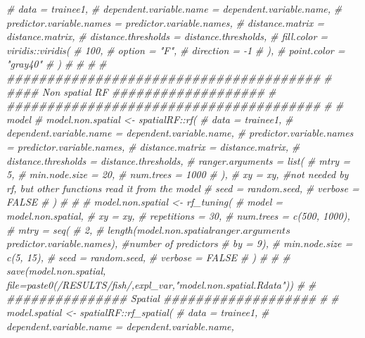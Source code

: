 \documentclass[
]{article}
\newenvironment{Shaded}{\begin{snugshade}}{\end{snugshade}}
\newcommand{\CommentTok}[1]{\textcolor[rgb]{0.56,0.35,0.01}{\textit{#1}}}
\begin{document}
\begin{Shaded}
\begin{Highlighting}[]
\CommentTok{\#   data = trainee1,}
\CommentTok{\#   dependent.variable.name = dependent.variable.name,}
\CommentTok{\#   predictor.variable.names = predictor.variable.names,}
\CommentTok{\#   distance.matrix = distance.matrix,}
\CommentTok{\#   distance.thresholds = distance.thresholds,}
\CommentTok{\#   fill.color = viridis::viridis(}
\CommentTok{\#     100,}
\CommentTok{\#     option = "F",}
\CommentTok{\#     direction = {-}1}
\CommentTok{\#   ),}
\CommentTok{\#   point.color = "gray40"}
\CommentTok{\# )}
\CommentTok{\# }
\CommentTok{\# }
\CommentTok{\# }
\CommentTok{\# \#\#\#\#\#\#\#\#\#\#\#\#\#\#\#\#\#\#\#\#\#\#\#\#\#\#\#\#\#\#\#\#\#\#\#\#\#\#\#}
\CommentTok{\# \#\#\#\# Non spatial RF \#\#\#\#\#\#\#\#\#\#\#\#\#\#\#\#\#\#\#}
\CommentTok{\# \#\#\#\#\#\#\#\#\#\#\#\#\#\#\#\#\#\#\#\#\#\#\#\#\#\#\#\#\#\#\#\#\#\#\#\#\#\#\#}
\CommentTok{\# \# model}
\CommentTok{\# model.non.spatial \textless{}{-} spatialRF::rf(}
\CommentTok{\#   data = trainee1,}
\CommentTok{\#   dependent.variable.name = dependent.variable.name,}
\CommentTok{\#   predictor.variable.names = predictor.variable.names,}
\CommentTok{\#   distance.matrix = distance.matrix,}
\CommentTok{\#   distance.thresholds = distance.thresholds,}
\CommentTok{\#   ranger.arguments = list(}
\CommentTok{\#     mtry = 5,}
\CommentTok{\#     min.node.size = 20,}
\CommentTok{\#     num.trees = 1000}
\CommentTok{\#   ),}
\CommentTok{\#   xy = xy, \#not needed by rf, but other functions read it from the model}
\CommentTok{\#   seed = random.seed,}
\CommentTok{\#   verbose = FALSE}
\CommentTok{\# )}
\CommentTok{\# }
\CommentTok{\# }
\CommentTok{\# model.non.spatial \textless{}{-} rf\_tuning(}
\CommentTok{\#   model = model.non.spatial,}
\CommentTok{\#   xy = xy,}
\CommentTok{\#   repetitions = 30,}
\CommentTok{\#   num.trees = c(500, 1000),}
\CommentTok{\#   mtry = seq(}
\CommentTok{\#     2,}
\CommentTok{\#     length(model.non.spatial$ranger.arguments$predictor.variable.names), \#number of predictors}
\CommentTok{\#     by = 9),}
\CommentTok{\#   min.node.size = c(5, 15),}
\CommentTok{\#   seed = random.seed,}
\CommentTok{\#   verbose = FALSE}
\CommentTok{\# )}
\CommentTok{\# }
\CommentTok{\# \# save(model.non.spatial, file=paste0(\textquotesingle{}/RESULTS/fish/\textquotesingle{},expl\_var,"model.non.spatial.Rdata"))}
\CommentTok{\# }
\CommentTok{\# \#\#\#\#\#\#\#\#\#\#\#\#\#\#\# Spatial \#\#\#\#\#\#\#\#\#\#\#\#\#\#\#\#\#\#\#}
\CommentTok{\# }
\CommentTok{\#   model.spatial \textless{}{-} spatialRF::rf\_spatial(}
\CommentTok{\#       data = trainee1,}
\CommentTok{\#       dependent.variable.name = dependent.variable.name,}

\end{Highlighting}
\end{Shaded}
\end{document}
